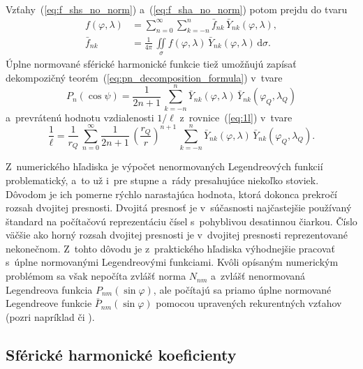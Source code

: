 \documentclass[a4paper, 12pt]{book}
\newcommand{\diff}{\mathrm d}
\begin{document}
Vzťahy~(\ref{eq:f_shs_no_norm}) a~(\ref{eq:f_sha_no_norm}) potom prejdu do
tvaru
%
\begin{align}
\label{eq:f_shs}
f(\varphi, \lambda) &= \sum_{n = 0}^\infty \sum_{k = -n}^n \bar{f}_{nk} \,
\bar{Y}_{nk}(\varphi, \lambda){,}\\
%
\label{eq:f_sha}
\bar{f}_{nk} &= \frac{1}{4\pi} \, \iint\limits_{\sigma} f(\varphi, \lambda) \,
\bar{Y}_{nk}(\varphi, \lambda) \, \diff \sigma{.}
\end{align}
%
Úplne normované sférické harmonické funkcie tiež umožňujú zapísať dekompozičný
teorém~(\ref{eq:pn_decomposition_formula}) v~tvare
\parencite{MoritzPhysicalGeodesy}
%
\begin{equation}
P_n(\cos\psi) = \frac{1}{2n + 1} \, \sum_{k = -n}^n \bar{Y}_{nk}(\varphi,
\lambda) \, \bar{Y}_{nk}(\varphi_Q, \lambda_Q)
\end{equation}
%
a~prevrátenú hodnotu vzdialenosti $1 \slash \ell$ z~rovnice~(\ref{eq:1l}) 
v~tvare
%
\begin{equation}
\label{eq:1l_sh}
\frac{1}{\ell} = \frac{1}{r_Q} \, \sum_{n = 0}^{\infty} \frac{1}{2n + 1} \, 
\left( \frac{r_Q}{r} \right)^{n + 1} \, \sum_{k = -n}^n \bar{Y}_{nk}(\varphi,
\lambda) \, \bar{Y}_{nk}(\varphi_Q, \lambda_Q){.}
\end{equation}

Z~numerického hľadiska je výpočet nenormovaných Legendreových funkcií 
problematický, a~to už i~pre stupne a~rády presahujúce niekoľko stoviek.  
Dôvodom je ich pomerne rýchlo narastajúca hodnota, ktorá dokonca prekročí 
rozsah dvojitej presnosti.  Dvojitá presnosť je v~súčasnosti najčastejšie 
používaný štandard na počítačovú reprezentáciu čísel s~pohyblivou desatinnou 
čiarkou.  Číslo väčšie ako horný rozsah dvojitej presnosti je v~dvojitej 
presnosti reprezentované nekonečnom.  Z~tohto dôvodu je z~praktického hľadiska 
výhodnejšie pracovať s~úplne normovanými Legendreovými funkciami.  Kvôli 
opísaným numerickým problémom sa však nepočíta zvlášť norma $N_{nm}$ a~zvlášť 
nenormovaná Legendreova funkcia $P_{nm}(\sin\varphi)$, ale počítajú sa priamo 
úplne normované Legendreove funkcie $\bar{P}_{nm}(\sin\varphi)$ pomocou 
upravených rekurentných vzťahov (pozri napríklad \cite{Holmes2002a} či 
\cite{Fukushima2012a}).



\subsection{Sférické harmonické koeficienty}
\label{sec:shc_norm}
\end{document}
